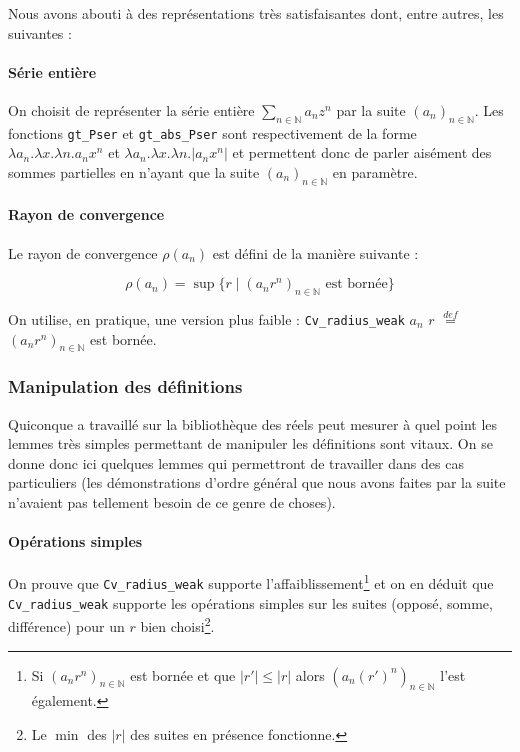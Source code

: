 \documentclass[a4paper,10pt]{article}
\newcommand{\coqcode}[1]{\texttt{#1}}
\begin{document}
Nous avons abouti à des représentations très satisfaisantes dont, entre autres, les suivantes :

\paragraph{Série entière} On choisit de représenter la série entière $\sum_{n\in \mathbb{N}} a_n z^n$ par la suite $\left(a_n\right)_{n\in \mathbb{N}}$. Les fonctions \coqcode{gt\_Pser} et \coqcode{gt\_abs\_Pser} sont respectivement de la forme $\lambda a_n.\lambda x.\lambda n.a_n x ^ n$ et $\lambda a_n.\lambda x.\lambda n.\left|a_n x ^ n\right|$ et permettent donc de parler aisément des sommes partielles en n'ayant que la suite $\left(a_n\right)_{n\in \mathbb{N}}$ en paramètre.

\paragraph{Rayon de convergence} Le rayon de convergence $\rho\left(a_n\right)$ est défini de la manière suivante :

$$\rho\left(a_n\right) = \sup \lbrace r \mid (a_n r^n)_{n\in \mathbb{N}} \text{ est bornée} \rbrace$$

\noindent On utilise, en pratique, une version plus faible : \coqcode{Cv\_radius\_weak} $a_n$ $r$ $\stackrel{def}{=}$ $\left(a_n r^n\right)_{n\in \mathbb{N}}$ est bornée.

\subsubsection{Manipulation des définitions}

Quiconque a travaillé sur la bibliothèque des réels peut mesurer à quel point les lemmes très simples permettant de manipuler les définitions sont vitaux. On se donne donc ici quelques lemmes qui permettront de travailler dans des cas particuliers (les démonstrations d'ordre général que nous avons faites par la suite n'avaient pas tellement besoin de ce genre de choses).

\paragraph{Opérations simples} On prouve que \coqcode{Cv\_radius\_weak} supporte l'affaiblissement\footnote{Si $\left(a_n r^n\right)_{n\in \mathbb{N}}$ est bornée et que $|r'| \le |r|$ alors $\left(a_n (r')^n\right)_{n\in \mathbb{N}}$ l'est également.} et on en déduit que \coqcode{Cv\_radius\_weak} supporte les opérations simples sur les suites (opposé, somme, différence) pour un $r$ bien choisi\footnote{Le $\min$ des $|r|$ des suites en présence fonctionne.}.
\end{document}
